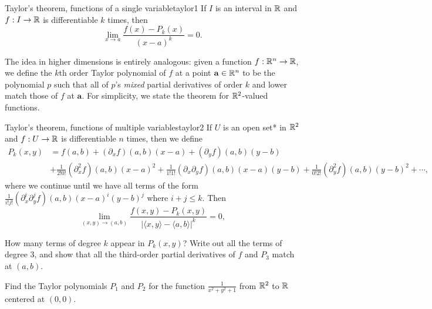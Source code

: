 \documentclass{watsonbook}
\begin{document}
  \begin{theo}{Taylor's theorem, functions of a single variable}{taylor1}
    If $I$ is an interval in $\mathbb{R}$ and $f: I \to \mathbb{R}$ is differentiable $k$ times, then
    \[
      \lim_{x\to a}\frac{f(x) - P_k(x)}{(x-a)^k} = 0. 
    \]
  \end{theo}
  
  The idea in higher dimensions is entirely analogous: given a
  function $f: \mathbb{R}^n \to \mathbb{R}$, we define the $k$th order Taylor
  polynomial of $f$ at a point $\mathbf{a} \in \mathbb{R}^n$ to be the
  polynomial $p$ such that all of $p$'s \textit{mixed} partial derivatives
  of order $k$ and lower match those of $f$ at $\mathbf{a}$. For
  simplicity, we state the theorem for $\mathbb{R}^2$-valued functions.

  \begin{theo}{Taylor's theorem, functions of multiple variables}{taylor2}
    If $U$ is an open set* in $\mathbb{R}^2$ and $f: U \to \mathbb{R}$ is differentiable $n$ times, then
    we define 
    \begin{align*}
      P_k(x,y) &= f(a,b) + (\partial_x f)(a,b)(x-a) +
      (\partial_y f)(a,b)(y-b) \\ &+ \frac{1}{2!0!}(\partial_x^2 f)(a,b)(x-a)^2 +
                                    \frac{1}{1!1!}(\partial_x\partial_y f)(a,b)(x-a)(y-b) +  \frac{1}{0!2!}(\partial_y^2
      f)(a,b)(y-b)^2 + \cdots, 
    \end{align*}
    where we continue until we have all terms of the form
    $\frac{1}{i!j!}(\partial_x^i\partial_y^j f)(a,b)(x-a)^i(y-b)^j$ where
    $i+j \leq k$. Then
    \[
      \lim_{(x,y) \to (a,b)}\frac{f(x,y) -
        P_k(x,y)}{|\langle x, y \rangle - \langle a,b \rangle|^k} = 0, 
    \]
  \end{theo}

  \begin{exercise}{}{}
    How many terms of degree $k$ appear in $P_k(x,y)$? Write out all
    the terms of degree 3, and show that all the third-order partial
    derivatives of $f$ and $P_3$ match at $(a,b)$.
  \end{exercise}

  \begin{exercise}{}{}
    Find the Taylor polynomials $P_1$ and $P_2$ for the function
    $\frac{1}{x^2 + y^2 + 1}$ from $\mathbb{R}^2$ to $\mathbb{R}$ centered at
    $(0,0)$. 
  \end{exercise}
  
\end{document}
